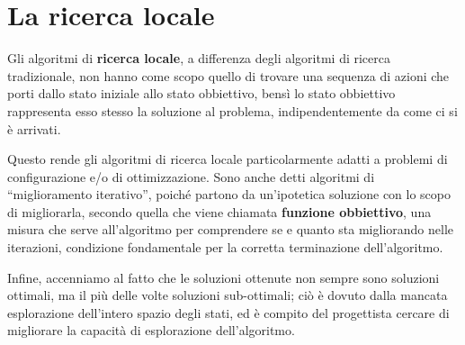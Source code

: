 \documentclass[a4paper, 11pt, oneside]{report}
\begin{document}
        \chapter{La ricerca locale}
        Gli algoritmi di \textbf{ricerca locale}, a differenza degli algoritmi di ricerca tradizionale, non hanno come scopo
        quello di trovare una sequenza di azioni che porti dallo stato iniziale allo stato obbiettivo, bensì lo stato
        obbiettivo rappresenta esso stesso la soluzione al problema, indipendentemente da come ci si è arrivati.
        \par \noindent Questo rende gli algoritmi di ricerca locale particolarmente adatti a problemi di configurazione
        e/o di ottimizzazione. Sono anche detti algoritmi di ``miglioramento iterativo'', poiché partono da un'ipotetica
        soluzione con lo scopo di migliorarla, secondo quella che viene chiamata \textbf{funzione obbiettivo}, una misura
        che serve all'algoritmo per comprendere se e quanto sta migliorando nelle iterazioni, condizione fondamentale per
        la corretta terminazione dell'algoritmo.
        \par \noindent Infine, accenniamo al fatto che le soluzioni ottenute non sempre sono soluzioni ottimali, ma il
        più delle volte soluzioni sub-ottimali; ciò è dovuto dalla mancata esplorazione dell'intero spazio degli stati, ed è
        compito del progettista cercare di migliorare la capacità di esplorazione dell'algoritmo.
\end{document}
